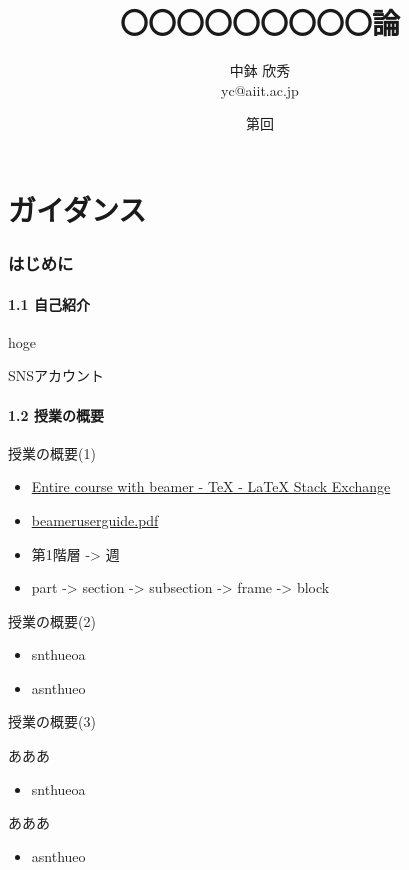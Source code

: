 \documentclass[t]{beamer}
\date{第{\insertpartnumber}回 \insertpart}
\institute[AIIT]{産業技術大学院大学(AIIT)}
\author{中鉢 欣秀 \\ yc@aiit.ac.jp}
\date{}
\title{〇〇〇〇〇〇〇〇〇論}
\begin{document}
\maketitle

\part{ガイダンス}
\label{sec-1}
\section{はじめに}
\label{sec-1-1}
\subsection{1.1 自己紹介}
\label{sec-1-1-1}
\begin{frame}[label=sec-1-1-1-1]{hoge}
\end{frame}
\begin{frame}[label=sec-1-1-1-2]{SNSアカウント}
\end{frame}
\subsection{1.2 授業の概要}
\label{sec-1-1-2}
\begin{frame}[label=sec-1-1-2-1]{授業の概要(1)}
\begin{itemize}
\item \href{http://tex.stackexchange.com/questions/52900/entire-course-with-beamer}{Entire course with beamer - \TeX{} - \LaTeX{} Stack Exchange}
\item \href{http://ctan.megagod.net/tex-archive/macros/latex/contrib/beamer/doc/beameruserguide.pdf}{beameruserguide.pdf}
\item 第1階層 -> 週
\item part -> section -> subsection -> frame -> block
\end{itemize}
\end{frame}
\begin{frame}[label=sec-1-1-2-2]{授業の概要(2)}
\begin{itemize}
\item snthueoa
\item asnthueo
\end{itemize}
\end{frame}
\begin{frame}[label=sec-1-1-2-3]{授業の概要(3)}
\begin{block}{あああ}
\begin{itemize}
\item snthueoa
\end{itemize}
\end{block}
\begin{block}{あああ}
\begin{itemize}
\item asnthueo
\end{itemize}
\end{block}
\end{frame}
\end{document}
